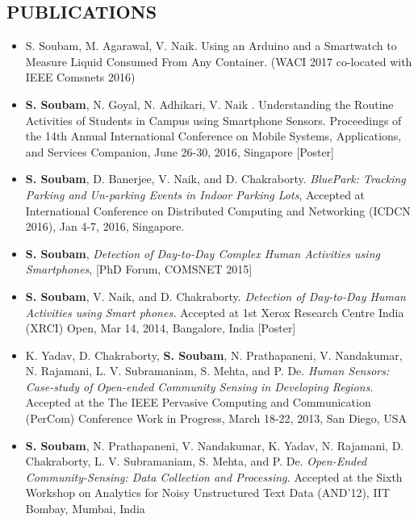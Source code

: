 \documentclass{res}
\begin{document}
\begin{resume}
 
 
\section{PUBLICATIONS}          
   \begin{itemize}
   \item S. Soubam, M. Agarawal, V. Naik. Using an Arduino and a Smartwatch to Measure Liquid Consumed From Any Container. (WACI 2017 co-located with IEEE Comsnets 2016)
   \item \textbf{S. Soubam}, N. Goyal, N. Adhikari, V. Naik . Understanding the Routine Activities of Students in Campus using Smartphone Sensors. Proceedings of the 14th Annual International Conference on Mobile Systems, Applications, and Services Companion, June 26-30, 2016, Singapore [Poster]
   \item \textbf{S. Soubam}, D. Banerjee, V. Naik, and D. Chakraborty.  \textit{BluePark: Tracking Parking and Un-parking Events in Indoor Parking Lots}, Accepted at International Conference on Distributed Computing and Networking (ICDCN 2016), Jan 4-7, 2016, Singapore.
   \item \textbf{S. Soubam}, \textit{Detection of Day-to-Day Complex Human Activities using Smartphones}, [PhD Forum, COMSNET 2015]
   \item \textbf{S. Soubam}, V. Naik, and D. Chakraborty. \textit{Detection of Day-to-Day Human Activities using Smart phones.} Accepted at 1st Xerox Research Centre India (XRCI) Open, Mar 14, 2014, Bangalore, India [Poster]

   \item K. Yadav, D. Chakraborty, \textbf{S. Soubam}, N. Prathapaneni, V. Nandakumar, N. Rajamani, L. V. Subramaniam, S. Mehta, and P. De. \textit{Human Sensors: Case-study of Open-ended Community Sensing in Developing Regions}. Accepted at the The IEEE Pervasive Computing and Communication (PerCom) Conference Work in Progress, March 18-22, 2013, San Diego, USA
   
   \item \textbf{S. Soubam}, N. Prathapaneni, V. Nandakumar, K. Yadav, N. Rajamani, D. Chakraborty, L. V. Subramaniam, S. Mehta, and P. De. \textit{Open-Ended Community-Sensing: Data Collection and Processing.} Accepted at the Sixth Workshop on Analytics for Noisy Unstructured Text Data (AND'12), IIT Bombay, Mumbai, India
   \end{itemize}        


\end{resume}
\end{document}
